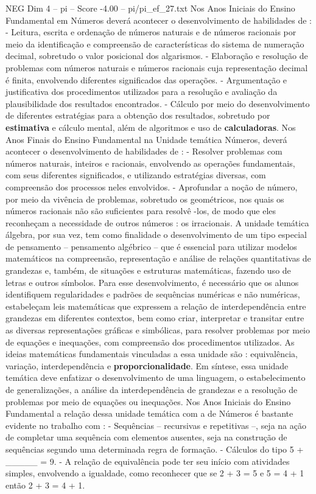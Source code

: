\begin{textsample}{NEG Dim 4 – pi – Score -4.00 – pi/pi\_ef\_27.txt}
Nos Anos Iniciais do Ensino Fundamental em Números deverá acontecer o desenvolvimento de habilidades de : - Leitura, escrita e ordenação de números naturais e de números racionais por meio da identificação e compreensão de características do sistema de numeração decimal, sobretudo o valor posicional dos algarismos. - Elaboração e resolução de problemas com números naturais e números racionais cuja representação decimal é finita, envolvendo diferentes significados das operações. - Argumentação e justificativa dos procedimentos utilizados para a resolução e avaliação da plausibilidade dos resultados encontrados. - Cálculo por meio do desenvolvimento de diferentes estratégias para a obtenção dos resultados, sobretudo por \textbf{estimativa} e cálculo mental, além de algoritmos e uso de \textbf{calculadoras}.
Nos Anos Finais do Ensino Fundamental na Unidade temática Números, deverá acontecer o desenvolvimento de habilidades de : - Resolver problemas com números naturais, inteiros e racionais, envolvendo as operações fundamentais, com seus diferentes significados, e utilizando estratégias diversas, com compreensão dos processos neles envolvidos. - Aprofundar a noção de número, por meio da vivência de problemas, sobretudo os geométricos, nos quais os números racionais não são suficientes para resolvê -los, de modo que eles reconheçam a necessidade de outros números : os irracionais.
A unidade temática álgebra, por sua vez, tem como finalidade o desenvolvimento de um tipo especial de pensamento – pensamento algébrico – que é essencial para utilizar modelos matemáticos na compreensão, representação e análise de relações quantitativas de grandezas e, também, de situações e estruturas matemáticas, fazendo uso de letras e outros símbolos.
Para esse desenvolvimento, é necessário que os alunos identifiquem regularidades e padrões de sequências numéricas e não numéricas, estabeleçam leis matemáticas que expressem a relação de interdependência entre grandezas em diferentes contextos, bem como criar, interpretar e transitar entre as diversas representações gráficas e simbólicas, para resolver problemas por meio de equações e inequações, com compreensão dos procedimentos utilizados.
As ideias matemáticas fundamentais vinculadas a essa unidade são : equivalência, variação, interdependência e \textbf{proporcionalidade}.
Em síntese, essa unidade temática deve enfatizar o desenvolvimento de uma linguagem, o estabelecimento de generalizações, a análise da interdependência de grandezas e a resolução de problemas por meio de equações ou inequações.
Nos Anos Iniciais do Ensino Fundamental a relação dessa unidade temática com a de Números é bastante evidente no trabalho com : - Sequências – recursivas e repetitivas –, seja na ação de completar uma sequência com elementos ausentes, seja na construção de sequências segundo uma determinada regra de formação. - Cálculos do tipo 5 + \_\_\_\_\_ = 9. - A relação de equivalência pode ter seu início com atividades simples, envolvendo a igualdade, como reconhecer que se 2 + 3 = 5 e 5 = 4 + 1 então 2 + 3 = 4 + 1.

\end{textsample}
